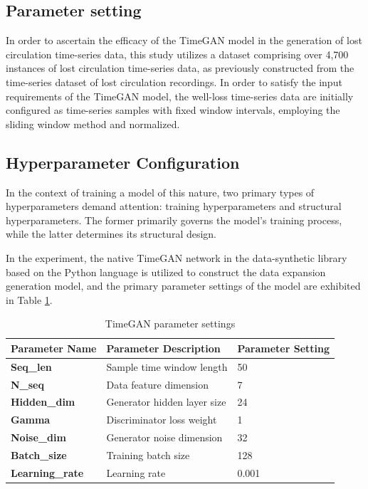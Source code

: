 \documentclass[journal,article,submit,pdftex,moreauthors]{Definitions/mdpi}
\begin{document}
\subsection{Parameter setting }

In order to ascertain the efficacy of the TimeGAN model in the generation of lost circulation time-series data, this study utilizes a dataset comprising over 4,700 instances of lost circulation time-series data, as previously constructed from the time-series dataset of lost circulation recordings. In order to satisfy the input requirements of the TimeGAN model, the well-loss time-series data are initially configured as time-series samples with fixed window intervals, employing the sliding window method and normalized.

\subsection{Hyperparameter Configuration}

In the context of training a model of this nature, two primary types of hyperparameters demand attention: training hyperparameters and structural hyperparameters. The former primarily governs the model's training process, while the latter determines its structural design. 

In the experiment, the native TimeGAN network in the data-synthetic library based on the Python language is utilized to construct the data expansion generation model, and the primary parameter settings of the model are exhibited in Table \ref{TimeGAN parameter settings}.

\begin{table}[H]
\centering
\caption{TimeGAN parameter settings}
\begin{tabular}{lll}
\toprule
\textbf{Parameter Name} & \textbf{Parameter Description} & \textbf{Parameter Setting} \\ 
\midrule
\textbf{Seq\_len}       & Sample time window length      & 50                          \\ 
\textbf{N\_seq}         & Data feature dimension         & 7                           \\ 
\textbf{Hidden\_dim}    & Generator hidden layer size    & 24                          \\ 
\textbf{Gamma}          & Discriminator loss weight      & 1                           \\ 
\textbf{Noise\_dim}     & Generator noise dimension      & 32                          \\ 
\textbf{Batch\_size}    & Training batch size            & 128                         \\ 
\textbf{Learning\_rate} & Learning rate                  & 0.001                       \\ 
\bottomrule
\end{tabular}

\label{TimeGAN parameter settings}
\end{table}
\end{document}
